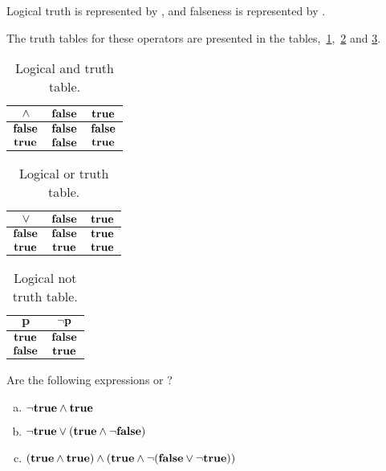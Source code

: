 Logical truth is represented by \True, and falseness is represented by
\False.

The truth tables for these operators are presented in the
tables,~\ref{tab:log-and-table},~\ref{tab:log-or-table} and
\ref{tab:log-not-table}.

\begin{table}
  \centering
  \begin{tabular}{|c|c|c|}
    \hline
    $\mathbf{\wedge}$ & $\mathbf{\textbf{false}}$ & $\mathbf{\textbf{true}}$ \\ \hline
    $\mathbf{\textbf{false}}$ & $\mathbf{\textbf{false}}$ & $\mathbf{\textbf{false}}$ \\ \hline
    $\mathbf{\textbf{true}}$ & $\mathbf{\textbf{false}}$ & $\mathbf{\textbf{true}}$ \\ \hline
  \end{tabular}
  \caption{Logical and truth table.}
  \label{tab:log-and-table}
\end{table}

\begin{table}
  \centering
  \begin{tabular}{|c|c|c|}
    \hline
    $\mathbf{\vee}$ & $\mathbf{\textbf{false}}$ & $\mathbf{\textbf{true}}$ \\ \hline
    $\mathbf{\textbf{false}}$ & $\textbf{false}$ & $\textbf{true}$ \\ \hline
    $\mathbf{\textbf{true}}$ & $\textbf{true}$ & $\textbf{true}$ \\ \hline
  \end{tabular}
  \caption{Logical or truth table.}
  \label{tab:log-or-table}
\end{table}

\begin{table}
  \centering
  \begin{tabular}{|c|c|}
    \hline
    $\mathbf{p}$ & $\mathbf{\neg p}$ \\ \hline
    $\textbf{true}$ & $\textbf{false}$ \\ \hline
    $\textbf{false}$ & $\textbf{true}$ \\ \hline
  \end{tabular}
  \caption{Logical not truth table.}
  \label{tab:log-not-table}
\end{table}

\begin{Exercise}[label={boolean}]
  Are the following expressions \True or \False?

  \begin{enumerate}[(a)]
  \item $\neg \textbf{true} \wedge \textbf{true}$
  \item $\neg \textbf{true} \vee (\textbf{true} \wedge \neg \textbf{false})$

  \item $(\textbf{true} \wedge \textbf{true}) \wedge (\textbf{true} \wedge \neg(\textbf{false} \vee \neg \textbf{true}))$

  \end{enumerate}
\end{Exercise}


